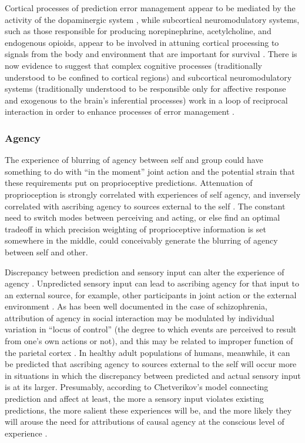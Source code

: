 \begin{CJK}{UTF8}{gbsn}
Cortical processes of prediction error management appear to be mediated by the activity of the dopaminergic system \citep{Schultz2016}, while subcortical neuromodulatory systems, such as those responsible for producing norepinephrine, acetylcholine, and endogenous opioids, appear to be involved in attuning cortical processing to signals from the body and environment that are important for survival \citep{Lewis2005}.  There is now evidence to suggest that complex cognitive processes (traditionally understood to be confined to cortical regions) and subcortical neuromodulatory systems (traditionally understood to be responsible only for affective response and exogenous to the brain's inferential processes) work in a loop of reciprocal interaction in order to enhance processes of error management \citep{Damasio1994,Lewis2005,Miller2017,Barrett2017}.

\subsubsection{Agency}
The experience of blurring of agency between self and group could have something to do with ``in the moment'' joint action and the potential strain that these requirements put on proprioceptive predictions.  Attenuation of proprioception is strongly correlated with experiences of self agency, and inversely correlated with ascribing agency to sources external to the self \citep{Brown2013}.  The constant need to switch modes between perceiving and acting, or else find an optimal tradeoff in which precision weighting of proprioceptive information is set somewhere in the middle, could conceivably generate the blurring of agency between self and other.

Discrepancy between prediction and sensory input can alter the experience of agency \citep{Sato2008}.  Unpredicted sensory input can lead to ascribing agency for that input to an external source, for example, other participants in joint action or the external environment \citep{Sato2005,Frith2007}.  As has been well documented in the case of schizophrenia, attribution of agency in social interaction may be modulated by individual variation in ``locus of control'' (the degree to which events are perceived to result from one’s own actions or not), and this may be related to improper function of the parietal cortex \citep{Frith2000}. In healthy adult populations of humans, meanwhile, it can be predicted that ascribing agency to sources external to the self will occur more in situations in which the discrepancy between predicted and actual sensory input is at its larger.  Presumably, according to Chetverikov's model connecting prediction and affect at least, the more a sensory input violates existing predictions, the more salient these experiences will be, and the more likely they will arouse the need for attributions of causal agency at the conscious level of experience \citep{Pesquita2017}.




\end{CJK}
